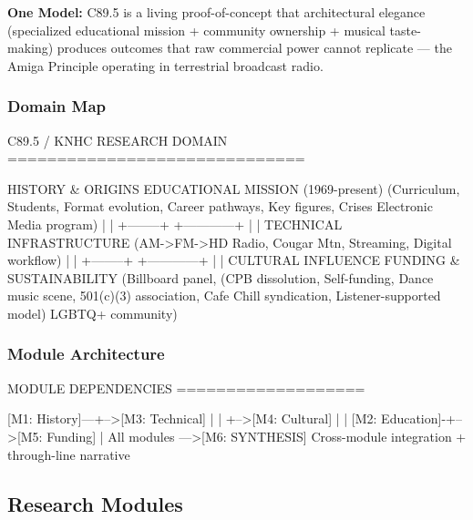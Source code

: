\documentclass[11pt,letterpaper]{article}
\begin{document}
\begin{quotebox}
\textbf{One Model:} C89.5 is a living proof-of-concept that architectural elegance (specialized educational mission + community ownership + musical taste-making) produces outcomes that raw commercial power cannot replicate --- the Amiga Principle operating in terrestrial broadcast radio.
\end{quotebox}

\subsubsection{Domain Map}

\begin{asciibox}
C89.5 / KNHC RESEARCH DOMAIN
==============================

  HISTORY & ORIGINS          EDUCATIONAL MISSION
  (1969-present)             (Curriculum, Students,
  Format evolution,           Career pathways,
  Key figures, Crises         Electronic Media program)
       |                           |
       +--------+     +------------+
                |     |
          TECHNICAL INFRASTRUCTURE
          (AM->FM->HD Radio, Cougar Mtn,
           Streaming, Digital workflow)
                |     |
       +--------+     +------------+
       |                           |
  CULTURAL INFLUENCE         FUNDING & SUSTAINABILITY
  (Billboard panel,          (CPB dissolution, Self-funding,
   Dance music scene,         501(c)(3) association,
   Cafe Chill syndication,    Listener-supported model)
   LGBTQ+ community)
\end{asciibox}

\subsubsection{Module Architecture}

\begin{asciibox}
MODULE DEPENDENCIES
===================

  [M1: History]---+-->[M3: Technical]
                  |         |
                  +-->[M4: Cultural]
                  |         |
  [M2: Education]-+-->[M5: Funding]
                           |
  All modules --->[M6: SYNTHESIS]
                  Cross-module integration
                  + through-line narrative
\end{asciibox}

\subsection{Research Modules}
\end{document}
